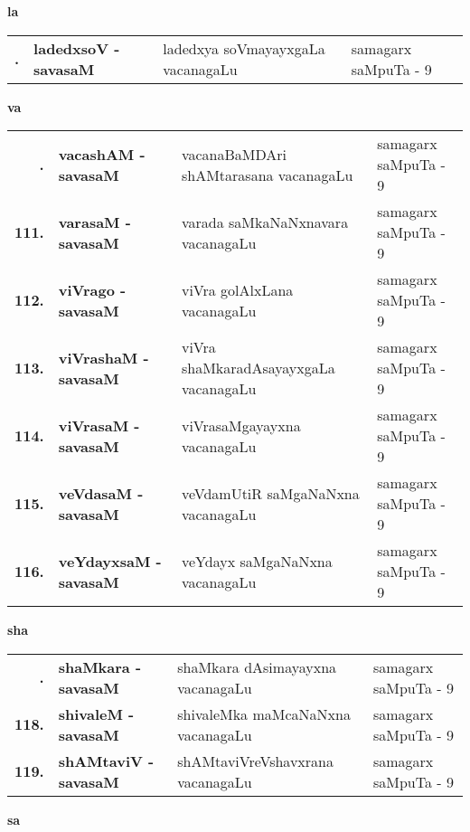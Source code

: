 \medskip

\centerline{\bf la}

{\renewcommand{\arraystretch}{1.3}
\begin{longtable}{>{\bf}r>{\bf}l>{\raggedright}p{8cm}l}
\endfirsthead
\endhead
\endfoot
\endlastfoot
109. &  ladedxsoV - savasaM &  ladedxya soVmayayxgaLa vacanagaLu & samagarx saMpuTa - 9 \\
\end{longtable}}
\smallskip

\centerline{\bf va}

{\renewcommand{\arraystretch}{1.3}
\begin{longtable}{>{\bf}r>{\bf}l>{\raggedright}p{8cm}l}
\endfirsthead
\endhead
\endfoot
\endlastfoot
110. &  vacashAM - savasaM & vacanaBaMDAri shAMtarasana vacanagaLu & samagarx saMpuTa - 9 \\
111. &  varasaM - savasaM &  varada saMkaNaNxnavara vacanagaLu & samagarx saMpuTa - 9 \\
112. &  viVrago - savasaM &  viVra golAlxLana vacanagaLu & samagarx saMpuTa - 9 \\
113. & viVrashaM - savasaM &  viVra shaMkaradAsayayxgaLa vacanagaLu & samagarx saMpuTa - 9 \\
114. & viVrasaM - savasaM & viVrasaMgayayxna vacanagaLu & samagarx saMpuTa - 9 \\
115. & veVdasaM - savasaM &  veVdamUtiR saMgaNaNxna vacanagaLu & samagarx saMpuTa - 9 \\
116. & veYdayxsaM - savasaM &  veYdayx saMgaNaNxna vacanagaLu & samagarx saMpuTa - 9
\end{longtable}}
\smallskip

\centerline{\bf sha}

{\renewcommand{\arraystretch}{1.3}
\begin{longtable}{>{\bf}r>{\bf}l>{\raggedright}p{8cm}l}
\endfirsthead
\endhead
\endfoot
\endlastfoot
117. & shaMkara - savasaM &  shaMkara dAsimayayxna vacanagaLu & samagarx saMpuTa - 9 \\
118. & shivaleM - savasaM &  shivaleMka maMcaNaNxna vacanagaLu & samagarx saMpuTa - 9 \\
119. & shAMtaviV - savasaM & shAMtaviVreVshavxrana vacanagaLu & samagarx saMpuTa - 9
\end{longtable}}
\smallskip

\centerline{\bf sa}

